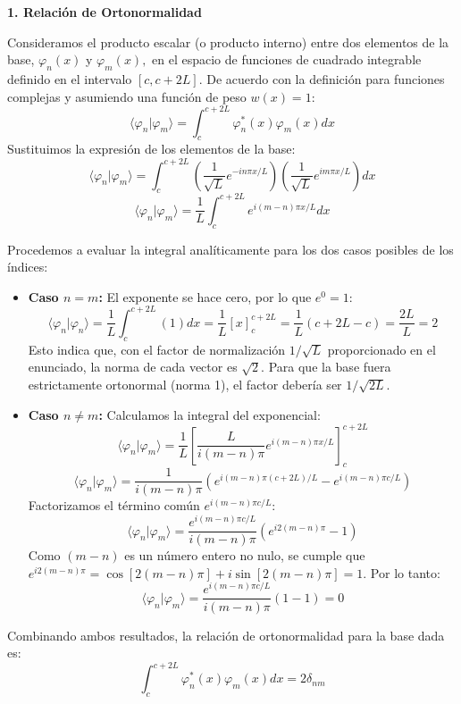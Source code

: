 \documentclass[a4paper]{article}
\begin{document}
\textbf{1. Relación de Ortonormalidad}

Consideramos el producto escalar (o producto interno) entre dos elementos de la base, $\varphi_n(x)$ y $\varphi_m(x),$ en el espacio de funciones de cuadrado integrable definido en el intervalo $[c, c+2L].$ De acuerdo con la definición para funciones complejas y asumiendo una función de peso $w(x) = 1$:
$$ \langle \varphi_n | \varphi_m \rangle = \int_{c}^{c+2L} \varphi_n^*(x) \varphi_m(x) dx $$
Sustituimos la expresión de los elementos de la base:
$$ \langle \varphi_n | \varphi_m \rangle = \int_{c}^{c+2L} \left( \frac{1}{\sqrt{L}} e^{-in\pi x / L} \right) \left( \frac{1}{\sqrt{L}} e^{im\pi x / L} \right) dx $$
$$ \langle \varphi_n | \varphi_m \rangle = \frac{1}{L} \int_{c}^{c+2L} e^{i(m-n)\pi x / L} dx $$

Procedemos a evaluar la integral analíticamente para los dos casos posibles de los índices:

\begin{itemize}
    \item \textbf{Caso $n = m$:}
    El exponente se hace cero, por lo que $e^0 = 1$:
    $$ \langle \varphi_n | \varphi_n \rangle = \frac{1}{L} \int_{c}^{c+2L} (1) dx = \frac{1}{L} [x]_{c}^{c+2L} = \frac{1}{L} (c + 2L - c) = \frac{2L}{L} = 2 $$
    Esto indica que, con el factor de normalización $1/\sqrt{L}$ proporcionado en el enunciado, la norma de cada vector es $\sqrt{2}.$ Para que la base fuera estrictamente ortonormal (norma 1), el factor debería ser $1/\sqrt{2L}.$
    
    \item \textbf{Caso $n \neq m$:}
    Calculamos la integral del exponencial:
    $$ \langle \varphi_n | \varphi_m \rangle = \frac{1}{L} \left[ \frac{L}{i(m-n)\pi} e^{i(m-n)\pi x / L} \right]_{c}^{c+2L} $$
    $$ \langle \varphi_n | \varphi_m \rangle = \frac{1}{i(m-n)\pi} \left( e^{i(m-n)\pi (c+2L) / L} - e^{i(m-n)\pi c / L} \right) $$
    Factorizamos el término común $e^{i(m-n)\pi c / L}$:
    $$ \langle \varphi_n | \varphi_m \rangle = \frac{e^{i(m-n)\pi c / L}}{i(m-n)\pi} \left( e^{i2(m-n)\pi} - 1 \right) $$
    Como $(m-n)$ es un número entero no nulo, se cumple que $e^{i2(m-n)\pi} = \cos[2(m-n)\pi] + i\sin[2(m-n)\pi] = 1.$ Por lo tanto:
    $$ \langle \varphi_n | \varphi_m \rangle = \frac{e^{i(m-n)\pi c / L}}{i(m-n)\pi} (1 - 1) = 0 $$
\end{itemize}

Combinando ambos resultados, la relación de ortonormalidad para la base dada es:
$$ \int_{c}^{c+2L} \varphi_n^*(x) \varphi_m(x) dx = 2 \delta_{nm} $$
\end{document}
